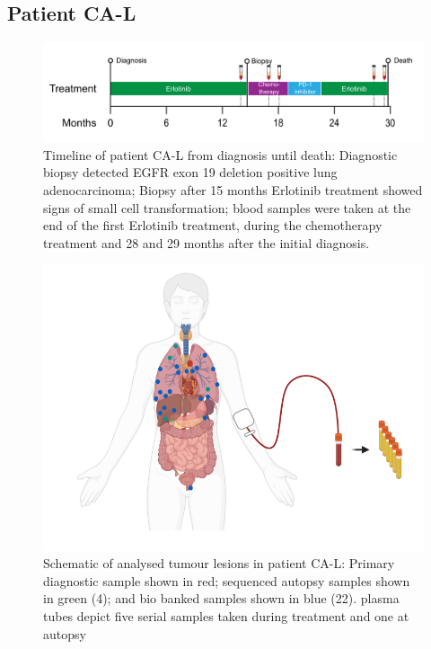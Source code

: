 \cleardoublepage

\subsection{Patient CA-L}
\label{cascade-sec:CA86}


\begin{figure}[!ht]
\centering
\includegraphics[width=.99\linewidth]{Figures/CA-L_timeline}
\caption[Timeline of patient CA-L from diagnosis until death]{Timeline of patient CA-L from diagnosis until death: Diagnostic biopsy detected EGFR exon 19 deletion positive lung adenocarcinoma;  Biopsy after 15 months Erlotinib treatment showed signs of small cell transformation; blood samples were taken at the end of the first Erlotinib treatment, during the chemotherapy treatment and  28 and 29 months after the initial diagnosis.} \label{fig:ca82timeline}
\end{figure}





\begin{figure}[!ht]
\centering
\includegraphics[width=.99\linewidth]{Figures/CA-L_schematic_CA86}
\caption[Schematic of analysed tumour lesions in patient CA-L]{Schematic of analysed tumour lesions in patient CA-L: Primary diagnostic sample shown in red; sequenced autopsy samples shown in green (4); and bio banked samples shown in blue (22). plasma tubes depict five serial samples taken during treatment and one at autopsy} \label{fig:cas86schematic}
\end{figure}



